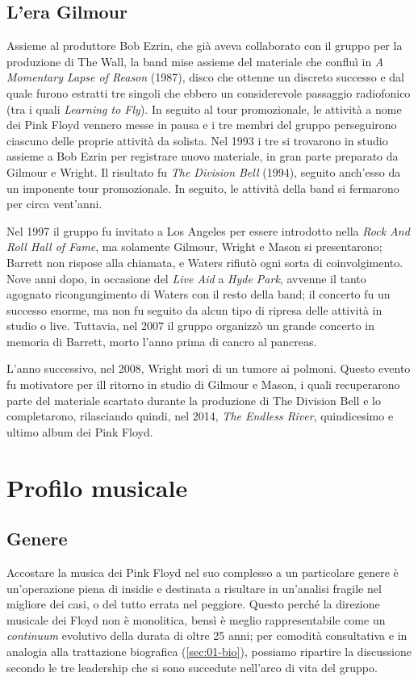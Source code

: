 \documentclass[class=book, crop=false, oneside, 12pt]{standalone}
\begin{document}
    \subsection{L'era Gilmour}
    Assieme al produttore Bob Ezrin, che già aveva collaborato con il gruppo per la produzione di The Wall, la band mise assieme del materiale che confluì in \emph{A Momentary Lapse of Reason} (1987), disco che ottenne un discreto successo e dal quale furono estratti tre singoli che ebbero un considerevole passaggio radiofonico (tra i quali \emph{Learning to Fly}). In seguito al tour promozionale, le attività a nome dei Pink Floyd vennero messe in pausa  e i tre membri del gruppo perseguirono ciascuno delle proprie attività da solista. Nel 1993 i tre si trovarono in studio assieme a Bob Ezrin per registrare nuovo materiale, in gran parte preparato da Gilmour e Wright. Il risultato fu \emph{The Division Bell} (1994), seguito anch'esso da un imponente tour promozionale. In seguito, le attività della band si fermarono per circa vent'anni.

    Nel 1997 il gruppo fu invitato a Los Angeles per essere introdotto nella \emph{Rock And Roll Hall of Fame}, ma solamente Gilmour, Wright e Mason si presentarono; Barrett non rispose alla chiamata, e Waters rifiutò ogni sorta di coinvolgimento. Nove anni dopo, in occasione del \emph{Live Aid} a \emph{Hyde Park}, avvenne il tanto agognato ricongungimento di Waters con il resto della band; il concerto fu un successo enorme, ma non fu seguito da alcun tipo di ripresa delle attività in studio o live. Tuttavia, nel 2007 il gruppo organizzò un grande concerto in memoria di Barrett, morto l'anno prima di cancro al pancreas.

    L'anno successivo, nel 2008, Wright morì di un tumore ai polmoni. Questo evento fu motivatore per ill ritorno in studio di Gilmour e Mason, i quali recuperarono parte del materiale scartato durante la produzione di The Division Bell e lo completarono, rilasciando quindi, nel 2014, \emph{The Endless River}, quindicesimo e ultimo album dei Pink Floyd.
    
    \section{Profilo musicale}
    
    \subsection{Genere}
    Accostare la musica dei Pink Floyd nel suo complesso a un particolare genere è un'operazione piena di insidie e destinata a risultare in un'analisi fragile nel migliore dei casi, o del tutto errata nel peggiore. Questo perché la direzione musicale dei Floyd non è monolitica, bensì è meglio rappresentabile come un \emph{continuum} evolutivo della durata di oltre 25 anni; per comodità consultativa e in analogia alla trattazione biografica (\ref{sec:01-bio}), possiamo ripartire la discussione secondo le tre leadership che si sono succedute nell'arco di vita del gruppo.
\end{document}
